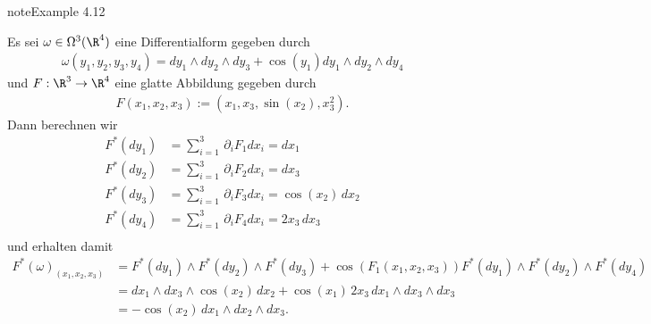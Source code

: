 \documentclass[letterpaper,10pt,english]{jupyterBook}
\begin{document}
\begin{sphinxadmonition}{note}{Example 4.12}



\sphinxAtStartPar
Es sei \(\omega\in \Omega^3(\R^4)\) eine Differentialform gegeben durch
\begin{equation*}
\begin{split}\omega(y_1,y_2,y_3,y_4) = dy_1\wedge dy_2\wedge dy_3 + \cos(y_1)dy_1\wedge dy_2 \wedge dy_4\end{split}
\end{equation*}
\sphinxAtStartPar
und \(F:\R^3\to\R^4\) eine glatte Abbildung gegeben durch
\begin{equation*}
\begin{split}F(x_1,x_2,x_3) := (x_1, x_3, \sin(x_2), x_3^2).\end{split}
\end{equation*}
\sphinxAtStartPar
Dann berechnen wir
\begin{equation*}
\begin{split}F^\ast(dy_1) &= \sum_{i=1}^3 \,\partial_i F_1 dx_i = dx_1\\
F^\ast(dy_2) &= \sum_{i=1}^3 \,\partial_i F_2 dx_i = dx_3\\
F^\ast(dy_3) &= \sum_{i=1}^3 \,\partial_i F_3 dx_i = \cos(x_2)\,dx_2\\
F^\ast(dy_4) &= \sum_{i=1}^3 \,\partial_i F_4 dx_i = 2x_3\,dx_3\\\end{split}
\end{equation*}
\sphinxAtStartPar
und erhalten damit
\begin{equation*}
\begin{split}F^\ast(\omega)_{(x_1,x_2,x_3)} &= F^\ast(dy_1)\wedge F^\ast(dy_2)\wedge F^\ast(dy_3) + 
\cos(F_1(x_1,x_2,x_3)) F^\ast(dy_1)\wedge F^\ast(dy_2)\wedge F^\ast(dy_4)\\
&= dx_1 \wedge dx_3\wedge \cos(x_2)\,dx_2 + \cos(x_1)\, 2x_3\,dx_1\wedge dx_3\wedge dx_3\\
&=  -\cos(x_2)\,dx_1 \wedge dx_2\wedge dx_3.\end{split}
\end{equation*}\end{sphinxadmonition}
\end{document}
